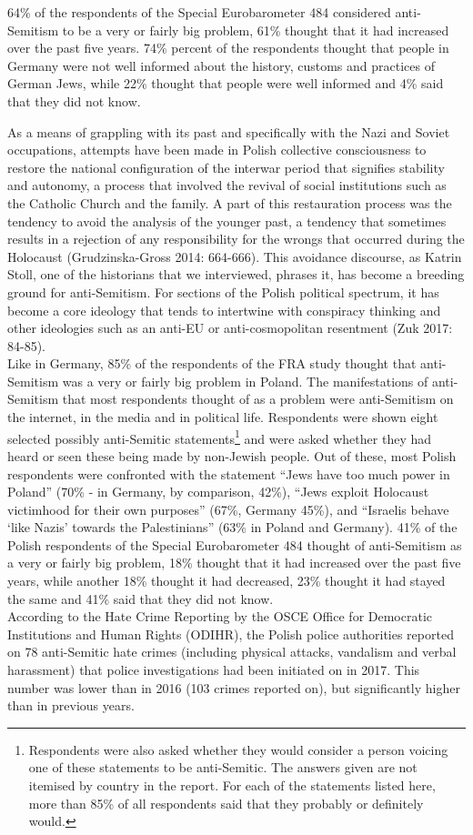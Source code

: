 64\% of the respondents of the Special Eurobarometer 484 considered anti-Semitism to be a very or fairly big problem, 61\% thought that it had increased over the past five years. 74\% percent of the respondents thought that people in Germany were not well informed about the history, customs and practices of German Jews, while 22\% thought that people were well informed and 4\% said that they did not know. \par
As a means of grappling with its past and specifically with the Nazi and Soviet occupations, attempts have been made in Polish collective consciousness to restore the national configuration of the interwar period that signifies stability and autonomy, a process that involved the revival of social institutions such as the Catholic Church and the family. A part of this restauration process was the tendency to avoid the analysis of the younger past, a tendency that sometimes results in a rejection of any responsibility for the wrongs that occurred during the Holocaust (Grudzinska-Gross 2014: 664-666). This avoidance discourse, as Katrin Stoll, one of the historians that we interviewed, phrases it, has become a breeding ground for anti-Semitism. For sections of the Polish political spectrum, it has become a core ideology that tends to intertwine with conspiracy thinking and other ideologies such as an anti-EU or anti-cosmopolitan resentment (Zuk 2017: 84-85). \\
Like in Germany, 85\% of the respondents of the FRA study thought that anti-Semitism was a very or fairly big problem in Poland. The manifestations of anti-Semitism that most respondents thought of as a problem were anti-Semitism on the internet, in the media and in political life. Respondents were shown eight selected possibly anti-Semitic statements\footnote{Respondents were also asked whether they would consider a person voicing one of these statements to be anti-Semitic. The answers given are not itemised by country in the report. For each of the statements listed here, more than 85\% of all respondents said that they probably or definitely would.} and were asked whether they had heard or seen these being made by non-Jewish people. Out of these, most Polish respondents were confronted with the statement ``Jews have too much power in Poland'' (70\% - in Germany, by comparison, 42\%), ``Jews exploit Holocaust victimhood for their own purposes'' (67\%, Germany 45\%), and ``Israelis behave `like Nazis' towards the Palestinians'' (63\% in Poland and Germany). 41\% of the Polish respondents of the Special Eurobarometer 484 thought of anti-Semitism as a very or fairly big problem, 18\% thought that it had increased over the past five years, while another 18\% thought it had decreased, 23\% thought it had stayed the same and 41\% said that they did not know.\\ According to the Hate Crime Reporting by the OSCE Office for Democratic Institutions and Human Rights (ODIHR), the Polish police authorities reported on 78 anti-Semitic hate crimes (including physical attacks, vandalism and verbal harassment) that police investigations had been initiated on in 2017. This number was lower than in 2016 (103 crimes reported on), but significantly higher than in previous years. 
